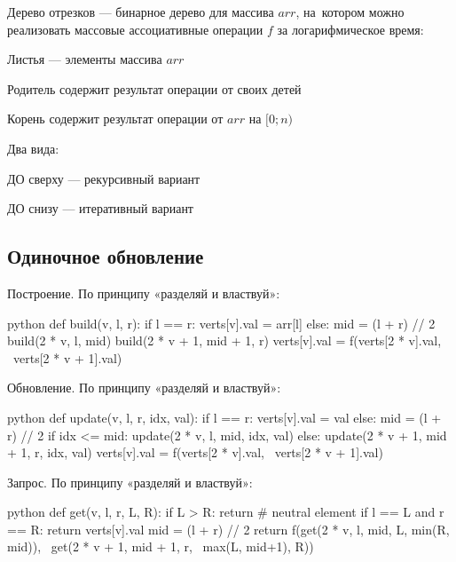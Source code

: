{\bold Дерево отрезков} --- бинарное дерево для массива $arr$, на~котором можно реализовать массовые ассоциативные операции $f$ за {\ital логарифмическое время}:
\begin{list*}[][\#]
\item Листья --- элементы массива $arr$
\item Родитель содержит {\ital результат операции} от своих детей
\item Корень содержит {\ital результат операции} от $arr$ на $[0;n)$
\end{list*}

Два вида:
\begin{list*}
\item ДО сверху --- рекурсивный вариант
\item ДО снизу --- итеративный вариант
\end{list*}

\subsection{Одиночное обновление}

{\bold Построение.} По принципу {\ital «разделяй и властвуй»}:
\begin{code}{python}
def build(v, l, r):
  if l == r:
    verts[v].val = arr[l]
  else:
    mid = (l + r) // 2
    build(2 * v, l, mid)
    build(2 * v + 1, mid + 1, r)
    verts[v].val = f(verts[2 * v].val, \
                     verts[2 * v + 1].val)
\end{code}

{\bold Обновление.} По принципу {\ital «разделяй и властвуй»}:
\begin{code}{python}
def update(v, l, r, idx, val):
  if l == r:
    verts[v].val = val
  else:
    mid = (l + r) // 2
    if idx <= mid:
      update(2 * v, l, mid, idx, val)
    else:
      update(2 * v + 1, mid + 1, r, idx, val)
    verts[v].val = f(verts[2 * v].val, \
                     verts[2 * v + 1].val)
\end{code}

{\bold Запрос.} По принципу {\ital «разделяй и властвуй»}:
\begin{code}{python}
def get(v, l, r, L, R):
  if L > R:
    return # neutral element
  if l == L and r == R:
    return verts[v].val
  mid = (l + r) // 2
  return f(get(2 * v, l, mid, L, min(R, mid)), \
           get(2 * v + 1, mid + 1, r, \
                                 max(L, mid+1), R))
\end{code}

